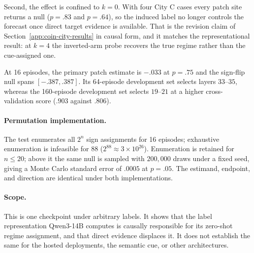 Second, the effect is confined to $k=0$. With four City C cases every patch site
returns a null ($p=.83$ and $p=.64$), so the induced label no longer controls the
forecast once direct target evidence is available. That is the revision claim of
Section~\ref{app:coin-city-results} in causal form, and it matches the
representational result: at $k=4$ the inverted-arm probe recovers the true regime
rather than the cue-assigned one.

At 16 episodes, the primary patch estimate is $-.033$ at $p=.75$ and the sign-flip
null spans $[-.387,.387]$. Its 64-episode development set selects layers
$33$--$35$, whereas the 160-episode development set selects $19$--$21$ at a
higher cross-validation score ($.903$ against $.806$).

\paragraph{Permutation implementation.} The test enumerates all $2^{n}$ sign
assignments for 16 episodes; exhaustive enumeration is infeasible for 88
($2^{88}\approx3\times10^{26}$). Enumeration is retained for $n\le20$; above it
the same null is sampled with $200{,}000$ draws under a fixed seed, giving a
Monte Carlo standard error of $.0005$ at $p=.05$. The estimand, endpoint, and
direction are identical under both implementations.

\paragraph{Scope.} This is one checkpoint under arbitrary labels. It shows that
the label representation Qwen3-14B computes is causally responsible for its
zero-shot regime assignment, and that direct evidence displaces it. It does not
establish the same for the hosted deployments, the semantic cue, or other
architectures.

